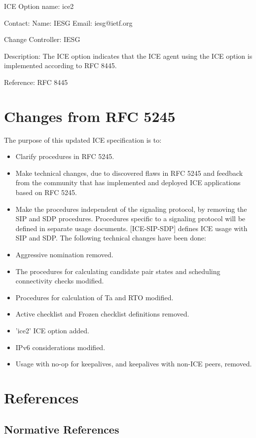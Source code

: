 \documentclass{article}
\begin{document}
ICE Option name: ice2

Contact: Name:    IESG Email:   iesg@ietf.org

Change Controller: IESG

Description: The ICE option indicates that the ICE agent using the ICE option is implemented according to RFC 8445.

Reference: RFC 8445

\section{Changes from RFC 5245}

The purpose of this updated ICE specification is to:

\begin{itemize}
\item Clarify procedures in RFC 5245.
\item Make technical changes, due to discovered flaws in RFC 5245 and feedback from the community that has implemented and deployed ICE applications based on RFC 5245.
\item Make the procedures independent of the signaling protocol, by removing the SIP and SDP procedures.  Procedures specific to a signaling protocol will be defined in separate usage documents. [ICE-SIP-SDP] defines ICE usage with SIP and SDP.
The following technical changes have been done:

\item Aggressive nomination removed.
\item The procedures for calculating candidate pair states and scheduling connectivity checks modified.
\item Procedures for calculation of Ta and RTO modified.
\item Active checklist and Frozen checklist definitions removed.
\item 'ice2' ICE option added.
\item IPv6 considerations modified.
\item Usage with no-op for keepalives, and keepalives with non-ICE peers, removed.
\end{itemize}
\section{References}

\subsection{Normative References}
\end{document}
